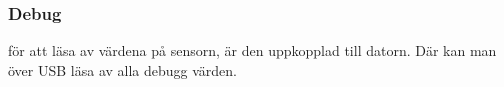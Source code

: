\subsubsection{Debug}
för att läsa av värdena på sensorn, är den uppkopplad till datorn. Där kan man över USB läsa av alla debugg värden.